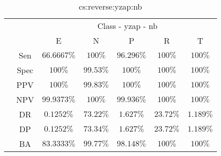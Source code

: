\begin{table}[!ht]
	\centering
	\begin{tabular}{|c|c|c|c|c|c|c|}
		\cline{3-7}
		\multicolumn{2}{c|}{} & \multicolumn{5}{c|}{Class - yzap - nb} \\ \cline{3-7}
		\multicolumn{2}{c|}{} & E & N & P & R & T \\ \hline
		\multirow{7}{*}{\rotatebox{90}{Statistics}} & Sen & $66.6667\%$ & $100\%$ & $96.296\%$ & $100\%$ & $100\%$ \\ \cline{2-7}
		 & Spec & $100\%$ & $99.53\%$ & $100\%$ & $100\%$ & $100\%$ \\ \cline{2-7}
		 & PPV & $100\%$ & $99.83\%$ & $100\%$ & $100\%$ & $100\%$ \\ \cline{2-7}
		 & NPV & $99.9373\%$ & $100\%$ & $99.936\%$ & $100\%$ & $100\%$ \\ \cline{2-7}
		 & DR & $0.1252\%$ & $73.22\%$ & $1.627\%$ & $23.72\%$ & $1.189\%$ \\ \cline{2-7}
		 & DP & $0.1252\%$ & $73.34\%$ & $1.627\%$ & $23.72\%$ & $1.189\%$ \\ \cline{2-7}
		 & BA & $83.3333\%$ & $99.77\%$ & $98.148\%$ & $100\%$ & $100\%$ \\ \hline
	\end{tabular}
	\caption{cs:reverse:yzap:nb}
	\label{tab:cs:reverse:yzap:nb}
\end{table}
